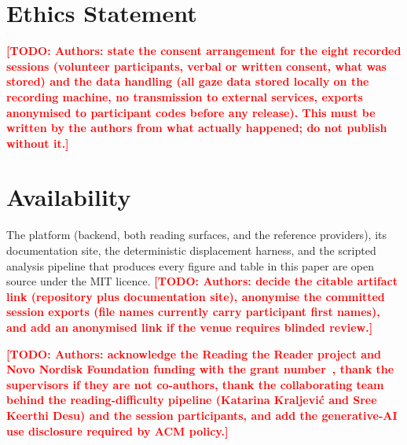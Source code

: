 \documentclass[sigconf,screen]{acmart}
\newcommand{\todopaper}[1]{\textcolor{red}{\textbf{[TODO: #1]}}}
\begin{document}
\section*{Ethics Statement}
\todopaper{Authors: state the consent arrangement for the eight recorded sessions (volunteer participants, verbal or written consent, what was stored) and the data handling (all gaze data stored locally on the recording machine, no transmission to external services, exports anonymised to participant codes before any release).
This must be written by the authors from what actually happened; do not publish without it.}

\section*{Availability}
The platform (backend, both reading surfaces, and the reference providers), its documentation site, the deterministic displacement harness, and the scripted analysis pipeline that produces every figure and table in this paper are open source under the MIT licence.
\todopaper{Authors: decide the citable artifact link (repository plus documentation site), anonymise the committed session exports (file names currently carry participant first names), and add an anonymised link if the venue requires blinded review.}

\begin{acks}
\todopaper{Authors: acknowledge the Reading the Reader project and Novo Nordisk Foundation funding with the grant number~\cite{dtucompute2025rtr, nnf2023rtr}, thank the supervisors if they are not co-authors, thank the collaborating team behind the reading-difficulty pipeline (Katarina Kraljevi\'{c} and Sree Keerthi Desu) and the session participants, and add the generative-AI use disclosure required by ACM policy.}
\end{acks}



\end{document}
